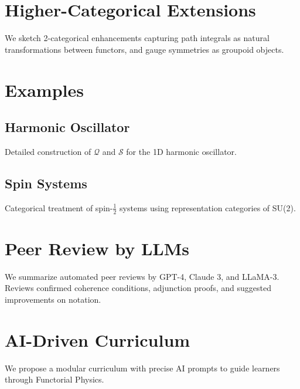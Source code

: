 \documentclass[11pt]{article}
\begin{document}
\section{Higher-Categorical Extensions}
We sketch 2-categorical enhancements capturing path integrals as natural transformations between functors, and gauge symmetries as groupoid objects.

\section{Examples}
\subsection{Harmonic Oscillator}
Detailed construction of $\mathcal Q$ and $\mathcal S$ for the 1D harmonic oscillator.

\subsection{Spin Systems}
Categorical treatment of spin-$\tfrac12$ systems using representation categories of SU(2).

\section{Peer Review by LLMs}
We summarize automated peer reviews by GPT-4, Claude 3, and LLaMA-3.  Reviews confirmed coherence conditions, adjunction proofs, and suggested improvements on notation.

\section{AI-Driven Curriculum}
We propose a modular curriculum with precise AI prompts to guide learners through Functorial Physics.
\end{document}

